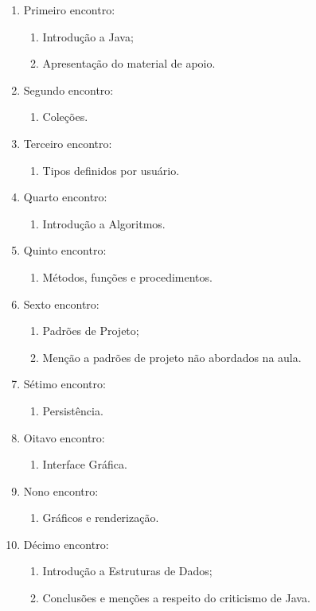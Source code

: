 \documentclass{article}
\begin{document}
\begin{enumerate}[label= (\alph*)]
    \item Primeiro encontro:
        \begin{enumerate}
            \item Introdução a Java;
            \item Apresentação do material de apoio.
        \end{enumerate}
    \item Segundo encontro:
        \begin{enumerate}
            \item Coleções.
        \end{enumerate}
    \item Terceiro encontro:
        \begin{enumerate}
            \item Tipos definidos por usuário.
        \end{enumerate}
    \item Quarto encontro:
        \begin{enumerate}
            \item Introdução a Algoritmos.
        \end{enumerate}
    \item Quinto encontro:
        \begin{enumerate}
            \item Métodos, funções e procedimentos.
        \end{enumerate}
    \item Sexto encontro:
        \begin{enumerate}
            \item Padrões de Projeto;
            \item Menção a padrões de projeto não abordados na aula.
        \end{enumerate}
    \item Sétimo encontro:
        \begin{enumerate}
            \item Persistência.
        \end{enumerate}
    \item Oitavo encontro:
        \begin{enumerate}
            \item Interface Gráfica.
        \end{enumerate}
    \item Nono encontro:
        \begin{enumerate}
            \item Gráficos e renderização.
        \end{enumerate}
    \item Décimo encontro:
        \begin{enumerate}
            \item Introdução a Estruturas de Dados;
            \item Conclusões e menções a respeito do criticismo de Java.
        \end{enumerate}
\end{enumerate}

\nocite{*}


\end{document}
